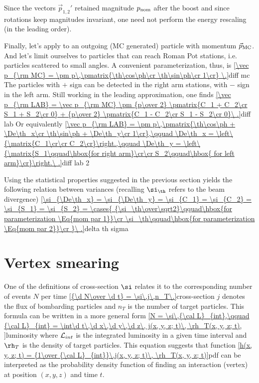 Since the vectors $\vec p_{1, 2}'$ retained magnitude $p_{\rm nom}$ after the boost and since rotations keep magnitudes invariant, one need not perform the energy rescaling (in the leading order).

Finally, let's apply  to an outgoing (MC generated) particle with momentum $\vec p_{\rm MC}$. And let's limit ourselves to particles that can reach Roman Pot stations, i.e. particles scattered to small angles. A convenient parameterization, thus, is
\eqref{\vec p_{\rm MC} = \pm p\,\pmatrix{\th\cos\ph\cr \th\sin\ph\cr 1\cr} \.}{diff mc}
The particles with $+$ sign can be detected in the right arm stations, with $-$ sign in the left arm. Still working in the leading approximation, one finds
\eqref{\vec p_{\rm LAB} = \vec p_{\rm MC} \pm {p\over 2} \pmatrix{C_1 + C_2\cr S_1 + S_2\cr 0} + {p\over 2} \pmatrix{C_1 - C_2\cr S_1 - S_2\cr 0}\ .}{diff lab}
Or equivalently
\eqref{\vec p_{\rm LAB} = \pm p\,\pmatrix{\th\cos\ph + \De\th_x\cr \th\sin\ph + \De\th_y\cr 1\cr},\qquad \De\th_x = \left\{\matrix{C_1\cr\cr C_2\cr}\right.,\qquad \De\th_y = \left\{\matrix{S_1\qquad\hbox{for right arm}\cr\cr S_2\qquad\hbox{ for left arm}\cr}\right.\ .}{diff lab 2} %

Using the statistical properties suggested in the previous section yields the following relation between variances (recalling $\si_\th$ refers to the beam divergence)
\eqref{\si_{\De\th_x} = \si_{\De\th_y} = \si_{C_1} = \si_{C_2} = \si_{S_1} = \si_{S_2} = \cases{
{\si_\th\over\sqrt2}\qquad\hbox{for parameterization \Eq{mom par 1}}\cr
\si_\th\qquad\hbox{for parameterization \Eq{mom par 2}}\cr
}\ .}{delta th sigma}


\section{Vertex smearing}

One of the definitions of cross-section $\si$ relates it to the corresponding number of events $N$ per time
\eqref{{\d N\over \d t} = \si\,j\,n_T\.}{cross-section}
$j$ denotes the flux of bombarding particles and $n_T$ is the number of target particles. This formula can be written in a more general form
\eqref{N = \si\,{\cal L}_{int},\qquad {\cal L}_{int} = \int\d t\,\d x\,\d y\,\d z\, j(x, y, z; t)\, \rh_T(x, y, z; t), }{luminosity}
where ${\cal L}_{int}$ is the integrated luminosity in a given time interval and $\rh_T$ is the density of target particles. This equation suggests that function
\eqref{h(x, y, z; t) = {1\over {\cal L}_{int}}\,j(x, y, z; t)\, \rh_T(x, y, z; t)}{pdf}
can be interpreted as the probability density function of finding an interaction (vertex) at position $(x, y, z)$ and time $t$.

